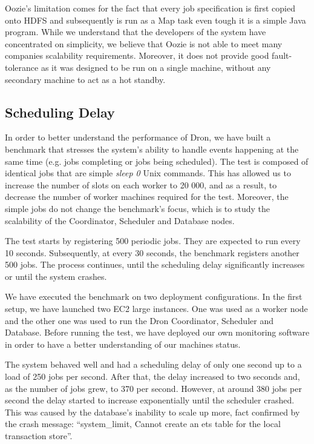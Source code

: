 \documentclass[11pt,a4paper,twoside]{report}
\begin{document}
Oozie's limitation comes for the fact that every job specification is first copied onto HDFS and subsequently is run as a Map task even tough it is a simple Java program. While we understand that the developers of the system have concentrated on simplicity, we believe that Oozie is not able to meet many companies scalability requirements. Moreover, it does not provide good fault-tolerance as it was designed to be run on a single machine, without any secondary machine to act as a hot standby.


\subsection{Scheduling Delay}
In order to better understand the performance of Dron, we have built a benchmark that stresses the system's ability to handle events happening at the same time (e.g. jobs completing or jobs being scheduled). The test is composed of identical jobs that are simple \textit{sleep 0} Unix commands. This has allowed us to increase the number of slots on each worker to 20 000, and as a result, to decrease the number of worker machines required for the test. Moreover, the simple jobs do not change the benchmark's focus, which is to study the scalability of the Coordinator, Scheduler and Database nodes.


The test starts by registering 500 periodic jobs. They are expected to run every 10 seconds. Subsequently, at every 30 seconds, the benchmark registers another 500 jobs. The process continues, until the scheduling delay significantly increases or until the system crashes.


We have executed the benchmark on two deployment configurations. In the first setup, we have launched two EC2 large instances. One was used as a worker node and the other one was used to run the Dron Coordinator, Scheduler and Database. Before running the test, we have deployed our own monitoring software in order to have a better understanding of our machines status.


The system behaved well and had a scheduling delay of only one second up to a load of 250 jobs per second. After that, the delay increased to two seconds and, as the number of jobs grew, to 370 per second. However, at around 380 jobs per second the delay started to increase exponentially until the scheduler crashed. This was caused by the database's inability to scale up more, fact confirmed by the crash message: ``system\_limit, Cannot create an ets table for the local transaction store''.
\end{document}
